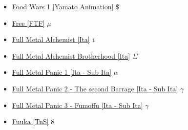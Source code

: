 \begin{itemize}
				\item \href{https://mega.nz/#F!OPwWya6I!Hz85WvvI63r2yF8ifJleBQ} {Food Wars 1 [Yamato Animation]}  $\$$ \\ 
				\item \href{https://mega.nz/#F!IwYSRY6B!JB7dD8MB9hsdB-VeBBM2jg} {Free [FTF]}  $\mu$ \\ 
				\item \href{https://mega.nz/#F!XT5SVaQD!3c8cXKvEITfiPVuj459y2A} {Full Metal Alchemist [Ita]}  $\oldstylenums{1}$ \\ 
				\item \href{https://mega.nz/#F!oipjyYyL!xTlAO-J6X8ucpUH9ohySCQ} {Full Metal Alchemist Brotherhood [Ita]}  $\Sigma$ \\ 
				\item \href{https://mega.nz/#F!YF9xTDbY!M0ZxxdTE6fiC6SjrN85VGQ} {Full Metal Panic 1 [Ita - Sub Ita]}  $\alpha$ \\ 
				\item \href{https://mega.nz/#F!s5QTUBpK!csqMYaljK94EuR_gwzi30g} {Full Metal Panic 2 - The second Barrage [Ita - Sub Ita]}  $\gamma$ \\ 
				\item \href{https://mega.nz/#F!p4JXiIya!bcBtB6U63fEcn48Rzgs6aA} {Full Metal Panic 3 - Fumoffu [Ita - Sub Ita]}  $\gamma$ \\ 
				\item \href{https://mega.nz/#F!ujgDRagY!dSy04SqHh9COKiqDQwmijw} {Fuuka [TnS]}  $\oldstylenums{8}$ \\ 
			
			\end{itemize}	
		

